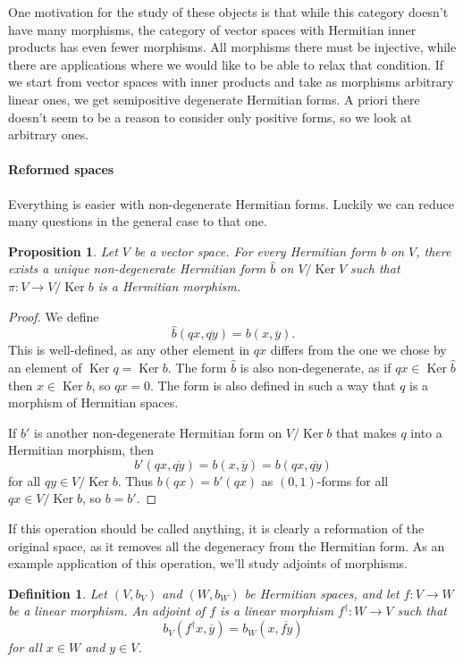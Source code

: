 \documentclass[10pt,a4paper]{article}
\newtheorem{prop}[theo]{Proposition}
\newtheorem{defi}[theo]{Definition}
\newtheorem*{proof}{Proof}
\def\ov#1{\overline{#1}}
\DeclareMathOperator{\Ker}{Ker}
\begin{document}
One motivation for the study of these objects is that while this category doesn't have many morphisms, the category of vector spaces with Hermitian inner products has even fewer morphisms. All morphisms there must be injective, while there are applications where we would like to be able to relax that condition. If we start from vector spaces with inner products and take as morphisms arbitrary linear ones, we get semipositive degenerate Hermitian forms. A priori there doesn't seem to be a reason to consider only positive forms, so we look at arbitrary ones.



\paragraph{Reformed spaces}

Everything is easier with non-degenerate Hermitian forms. Luckily we can reduce many questions in the general case to that one.

\begin{prop}
Let $V$ be a vector space. For every Hermitian form $b$ on $V$, there exists a unique non-degenerate Hermitian form $\hat b$ on $V / \Ker V$ such that $\pi : V \to V/\Ker b$ is a Hermitian morphism.
\end{prop}


\begin{proof}
We define
\[
\hat b(qx, \ov{qy})
= b(x, \ov y).
\]
This is well-defined, as any other element in $qx$ differs from the one we chose by an element of $\Ker q = \Ker b$. The form $\hat b$ is also non-degenerate, as if $qx \in \Ker \hat b$ then $x \in \Ker b$, so $qx = 0$. The form is also defined in such a way that $q$ is a morphism of Hermitian spaces.

If $b'$ is another non-degenerate Hermitian form on $V / \Ker b$ that makes $q$ into a Hermitian morphism, then
\[
b'(qx, \ov{qy})
= b(x, \ov{y})
= b(qx, \ov{qy})
\]
for all $qy \in V / \Ker b$. Thus $b(qx) = b'(qx)$ as $(0,1)$-forms for all $qx \in V / \Ker b$, so $b = b'$.
\end{proof}


If this operation should be called anything, it is clearly a reformation of the original space, as it removes all the degeneracy from the Hermitian form. As an example application of this operation, we'll study adjoints of morphisms.


\begin{defi}
Let $(V, b_V)$ and $(W, b_W)$ be Hermitian spaces, and let $f : V \to W$ be a linear morphism. An \emph{adjoint} of $f$ is a linear morphism $f^\dagger : W \to V$ such that
\[
b_V(f^\dagger x, \ov y)
= b_W(x, \ov{f y})
\]
for all $x \in W$ and $y \in V$.
\end{defi}
\end{document}
